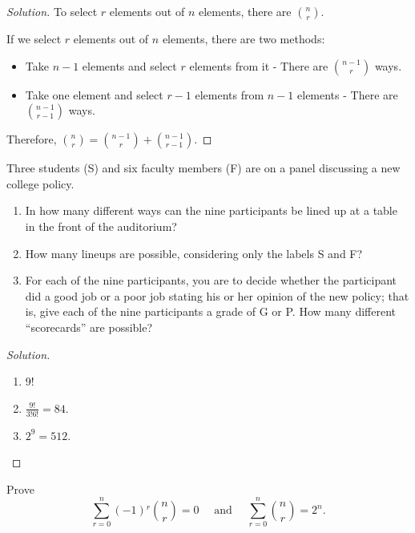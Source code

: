 \documentclass[class=probandstats,crop=false]{standalone}
\begin{document}
\begin{proof}[Solution]
    \par To select $r$ elements out of $n$ elements, there are $\binom{n}{r}$.
    \par If we select $r$ elements out of $n$ elements, there are two methods:
    \begin{itemize}
        \item Take $n - 1$ elements and select $r$ elements from it - There are $\binom{n-1}{r}$ ways.
        \item Take one element and select $r - 1$ elements from $n - 1$ elements - There are $\binom{n-1}{r-1}$ ways.
    \end{itemize}
    \par Therefore, $\binom{n}{r} = \binom{n-1}{r} + \binom{n-1}{r-1}$.
\end{proof}

\begin{exercise}
    \par Three students (S) and six faculty members (F) are on a panel discussing a new college policy.
    \begin{enumerate}[label = \textbf{(\alph*)}]
        \item In how many different ways can the nine participants be lined up at a table in the front of the auditorium?
        \item How many lineups are possible, considering only the labels S and F?
        \item For each of the nine participants, you are to decide whether the participant did a good job or a poor job stating his or her opinion of the new policy; that is, give each of the nine participants a grade of G or P. How many different “scorecards” are possible?
    \end{enumerate}
\end{exercise}

\begin{proof}[Solution]
    \begin{enumerate}[label = \textbf{(\alph*)}]
        \item 9!
        \item $\frac{9!}{3!6!} = 84$.
        \item $2^{9} = 512$.
    \end{enumerate}
\end{proof}

\begin{exercise}
    \par Prove
    \[
        \sum^{n}_{r=0}(-1){}^{r}\binom{n}{r} = 0
        \quad\text{ and }\quad
        \sum^{n}_{r=0}\binom{n}{r} = 2^{n}.
    \]
\end{exercise}
\end{document}
